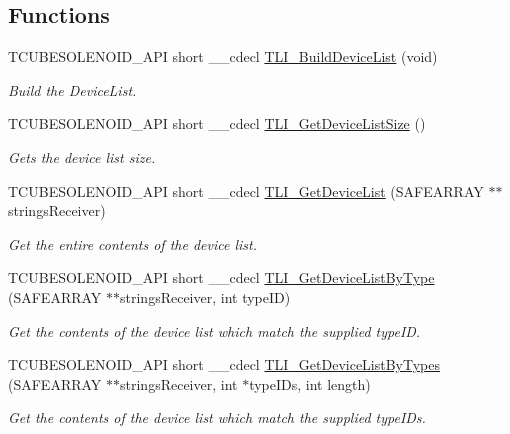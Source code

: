 \subsection*{Functions}
\begin{DoxyCompactItemize}
\item 
T\+C\+U\+B\+E\+S\+O\+L\+E\+N\+O\+I\+D\+\_\+\+A\+PI short \+\_\+\+\_\+cdecl \hyperlink{group___t_cube_solenoid_ga0b0fe6006d7b667fc13c2b03f579cd47}{T\+L\+I\+\_\+\+Build\+Device\+List} (void)
\begin{DoxyCompactList}\small\item\em Build the Device\+List. \end{DoxyCompactList}\item 
T\+C\+U\+B\+E\+S\+O\+L\+E\+N\+O\+I\+D\+\_\+\+A\+PI short \+\_\+\+\_\+cdecl \hyperlink{group___t_cube_solenoid_ga65875ed1f1286082498b98ca9cb59370}{T\+L\+I\+\_\+\+Get\+Device\+List\+Size} ()
\begin{DoxyCompactList}\small\item\em Gets the device list size. \end{DoxyCompactList}\item 
T\+C\+U\+B\+E\+S\+O\+L\+E\+N\+O\+I\+D\+\_\+\+A\+PI short \+\_\+\+\_\+cdecl \hyperlink{group___t_cube_solenoid_gaf0faf69b6b658a77830e905cf4486ffb}{T\+L\+I\+\_\+\+Get\+Device\+List} (S\+A\+F\+E\+A\+R\+R\+AY $\ast$$\ast$strings\+Receiver)
\begin{DoxyCompactList}\small\item\em Get the entire contents of the device list. \end{DoxyCompactList}\item 
T\+C\+U\+B\+E\+S\+O\+L\+E\+N\+O\+I\+D\+\_\+\+A\+PI short \+\_\+\+\_\+cdecl \hyperlink{group___t_cube_solenoid_ga5e5ba44fa5e884e163f4040afe7e22a2}{T\+L\+I\+\_\+\+Get\+Device\+List\+By\+Type} (S\+A\+F\+E\+A\+R\+R\+AY $\ast$$\ast$strings\+Receiver, int type\+ID)
\begin{DoxyCompactList}\small\item\em Get the contents of the device list which match the supplied type\+ID. \end{DoxyCompactList}\item 
T\+C\+U\+B\+E\+S\+O\+L\+E\+N\+O\+I\+D\+\_\+\+A\+PI short \+\_\+\+\_\+cdecl \hyperlink{group___t_cube_solenoid_ga280c8f087191df73cdf7813ada4df8aa}{T\+L\+I\+\_\+\+Get\+Device\+List\+By\+Types} (S\+A\+F\+E\+A\+R\+R\+AY $\ast$$\ast$strings\+Receiver, int $\ast$type\+I\+Ds, int length)
\begin{DoxyCompactList}\small\item\em Get the contents of the device list which match the supplied type\+I\+Ds. \end{DoxyCompactList}\item 
$$
\end{DoxyCompactItemize}
